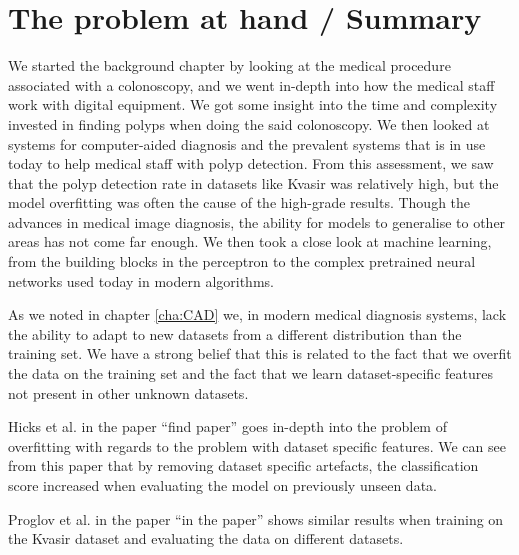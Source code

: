      
   
\section{The problem at hand / Summary}
We started the background chapter by looking at the medical procedure associated with a colonoscopy, and we went in-depth into how the medical staff work with digital equipment. We got some insight into the time and complexity invested in finding polyps when doing the said colonoscopy.
We then looked at systems for computer-aided diagnosis and the prevalent systems that is in use today to help medical staff with polyp detection. 
From this assessment, we saw that the polyp detection rate in datasets like Kvasir was relatively high, but the model overfitting was often the cause of the high-grade results. Though the advances in medical image diagnosis, the ability for models to generalise to other areas has not come far enough.
We then took a close look at machine learning, from the building blocks in the perceptron to the complex pretrained neural networks used today in modern algorithms. 

As we noted in chapter \ref{cha:CAD} we, in modern medical diagnosis systems, lack the ability to adapt to new datasets from a different distribution than the training set. We have a strong belief that this is related to the fact that we overfit the data on the training set and the fact that we learn dataset-specific features not present in other unknown datasets.


Hicks et al. in the paper ``find paper'' goes in-depth into the problem of overfitting with regards to the problem with dataset specific features. We can see from this paper that by removing dataset specific artefacts, the classification score increased when evaluating the model on previously unseen data.

Proglov et al. in the paper ``in the paper'' shows similar results when training on the Kvasir dataset and evaluating the data on different datasets.


